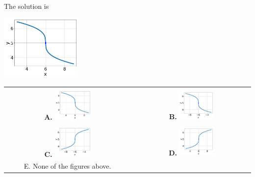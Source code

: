 \documentclass{article}[14pt]
\begin{document}
 
 The solution is  
 \begin{center} \includegraphics[width=0.3\textwidth]{../Figures/radicalEquationToGraphBA.png} \end{center}\begin{tabular}{|c|c|} 
\hline 
 & \tabularnewline 
 \textbf{A.} \includegraphics[width=0.3\textwidth]{../Figures/radicalEquationToGraphBA.png} & \textbf{B.} \includegraphics[width=0.3\textwidth]{../Figures/radicalEquationToGraphBB.png} \tabularnewline 
\hline 
 & \tabularnewline 
 \textbf{C.} \includegraphics[width=0.3\textwidth]{../Figures/radicalEquationToGraphBC.png} & \textbf{D.} \includegraphics[width=0.3\textwidth]{../Figures/radicalEquationToGraphBD.png} \tabularnewline 
\hline 
 E. None of the figures above. & \tabularnewline 
\hline 
 \end{tabular} 
 
\end{document}
